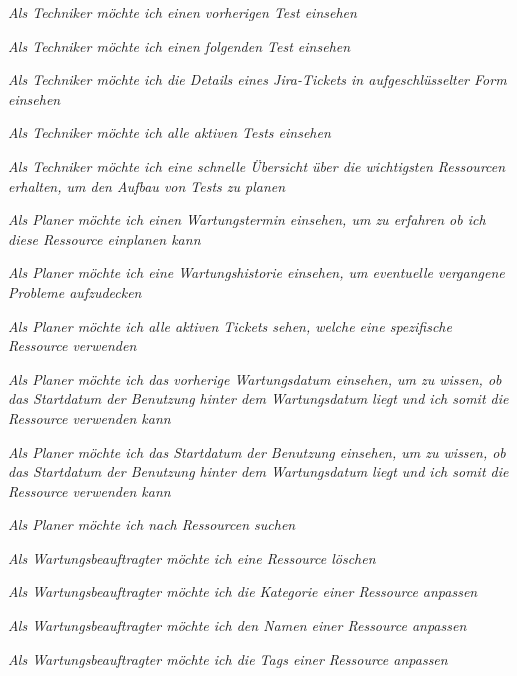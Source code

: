 \begin{description}
    \textit{Als Techniker möchte ich einen vorherigen Test einsehen}

    \textit{Als Techniker möchte ich einen folgenden Test einsehen}

    \textit{Als Techniker möchte ich die Details eines Jira-Tickets in 
    aufgeschlüsselter Form einsehen}

    \textit{Als Techniker möchte ich alle aktiven Tests einsehen}

    \textit{Als Techniker möchte ich eine schnelle Übersicht über die wichtigsten
    Ressourcen erhalten, um den Aufbau von Tests zu planen}

    \textit{Als Planer möchte ich einen Wartungstermin einsehen, um zu erfahren
    ob ich diese Ressource einplanen kann}

    \textit{Als Planer möchte ich eine Wartungshistorie einsehen, um eventuelle
    vergangene Probleme aufzudecken}

    \textit{Als Planer möchte ich alle aktiven Tickets sehen, 
    welche eine spezifische Ressource verwenden}

    \textit{Als Planer möchte ich das vorherige Wartungsdatum einsehen, 
    um zu wissen, ob das Startdatum der Benutzung hinter dem Wartungsdatum liegt
    und ich somit die Ressource verwenden kann}

    \textit{Als Planer möchte ich das Startdatum der Benutzung einsehen,
    um zu wissen, ob das Startdatum der Benutzung hinter dem Wartungsdatum liegt
    und ich somit die Ressource verwenden kann }

    \textit{Als Planer möchte ich nach Ressourcen suchen}

    \textit{Als Wartungsbeauftragter möchte ich eine Ressource löschen}

    \textit{Als Wartungsbeauftragter möchte ich die Kategorie einer Ressource anpassen}

    \textit{Als Wartungsbeauftragter möchte ich den Namen einer Ressource anpassen}

    \textit{Als Wartungsbeauftragter möchte ich die Tags einer Ressource anpassen}


\end{description}
